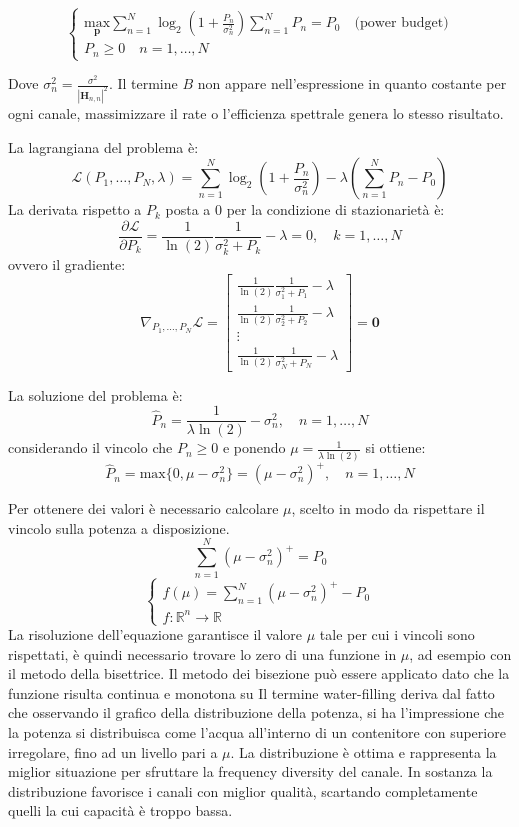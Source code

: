 \[
    \begin{cases}
       \underset{\mathbf{p}}{\text{max}} \sum_{n=1}^{N} \log_2(1 + \frac{P_n}{\sigma_n^2})
       \sum_{n=1}^{N} P_n = P_0 \quad \text{(power budget)} \\
        P_n \geq 0 \quad n = 1, \ldots, N
    \end{cases}    
\]

Dove $\sigma_n^2 = \frac{\sigma^2}{\left| \mathbf{H}_{n, n} \right| ^2}$. Il termine $B$ non appare nell'espressione in quanto costante per ogni canale, massimizzare il rate o l'efficienza spettrale genera lo stesso risultato.

La lagrangiana del problema è:
\[
    \mathcal{L}(P_1, \hdots, P_N, \lambda ) = \sum_{n=1}^{N} \log_2(1 + \frac{P_n}{\sigma_n^2}) - \lambda \left( \sum_{n=1}^{N} P_n - P_0 \right)
\]
La derivata rispetto a $P_k$ posta a 0 per la condizione di stazionarietà è:
\[
    \frac{\partial \mathcal{L}}{\partial P_k} = \frac{1}{\ln(2)} \frac{1}{\sigma_k^2 + P_k} - \lambda = 0, \quad k = 1, \ldots, N
\]
ovvero il gradiente:
\[
    \nabla_{P_1, \hdots, P_N} \mathcal{L} = \begin{bmatrix}
        \frac{1}{\ln(2)} \frac{1}{\sigma_1^2 + P_1} - \lambda \\
        \frac{1}{\ln(2)} \frac{1}{\sigma_2^2 + P_2} - \lambda \\
        \vdots \\
        \frac{1}{\ln(2)} \frac{1}{\sigma_N^2 + P_N} - \lambda
\end{bmatrix} = \mathbf{0}
\]

La soluzione del problema è:
\[
    \hat{P}_n = \frac{1}{\lambda \ln(2)} - \sigma_n^2, \quad n = 1, \ldots, N
\]
considerando il vincolo che $P_n \geq 0$ e ponendo $\mu = \frac{1}{\lambda \ln(2)}$ si ottiene:
\[
    \hat{P}_n = \text{max} \{ 0, \mu - \sigma_n^2    \} = (\mu - \sigma_n^2)^+, \quad n = 1, \ldots, N
\]

Per ottenere dei valori è necessario calcolare $\mu$, scelto in modo da rispettare il vincolo sulla potenza a disposizione.
\[
    \sum_{n=1}^{N} (\mu - \sigma_n^2)^+ = P_0
\]
\[
    \begin{cases}
        f(\mu) = \sum_{n=1}^{N} (\mu - \sigma_n^2)^+ - P_0 \\
        f: \mathbb{R}^n \rightarrow \mathbb{R}
    \end{cases}
\]
La risoluzione dell'equazione garantisce il valore $\mu$ tale per cui i vincoli sono rispettati, è quindi necessario trovare lo zero di una funzione in $\mu$, ad esempio con il metodo della bisettrice.
Il metodo dei bisezione può essere applicato dato che la funzione risulta continua e monotona su%
Il termine water-filling deriva dal fatto che osservando il grafico della distribuzione della potenza, si ha l'impressione che la potenza si distribuisca come l'acqua all'interno di un contenitore con superiore irregolare, fino ad un livello pari a $\mu$.
La distribuzione è ottima e rappresenta la miglior situazione per sfruttare la frequency diversity del canale.
In sostanza la distribuzione favorisce i canali con miglior qualità, scartando completamente quelli la cui capacità è troppo bassa.




